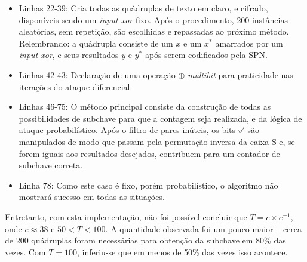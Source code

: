 \documentclass{article}
\begin{document}


\begin{itemize}

    \item Linhas 22-39: Cria todas as quádruplas de texto em claro, e cifrado,
        disponíveis sendo um \textit{input-xor} fixo. Após o procedimento, 200
        instâncias aleatórias, sem repetição, são escolhidas e repassadas ao
        próximo método. Relembrando: a quádrupla consiste de um $x$ e um $x^*$
        amarrados por um \textit{input-xor}, e seus resultados $y$ e $y^*$ após
        serem codificados pela SPN.

    \item Linhas 42-43: Declaração de uma operação $\oplus$ \textit{multibit}
        para praticidade nas iterações do ataque diferencial.

    \item Linhas 46-75: O método principal consiste da construção de todas as
        possibilidades de subchave para que a contagem seja realizada, e da
        lógica de ataque probabilístico. Após o filtro de pares inúteis, os
        bits $v'$ são manipulados de modo que passam pela permutação inversa
        da caixa-S e, se forem iguais aos resultados desejados, contribuem
        para um contador de subchave correta.

    \item Linha 78: Como este caso é fixo, porém probabilístico, o algoritmo
        não mostrará sucesso em todas as situações.

\end{itemize}

Entretanto, com esta implementação, não foi possível concluir que
$T = c \times e^{-1}$, onde $e \approx 38$ e $50 < T < 100$. A quantidade
observada foi um pouco maior -- cerca de 200 quádruplas foram necessárias para
obtenção da subchave em 80\% das vezes. Com $T = 100$, inferiu-se que em menos
de 50\% das vezes isso acontece.



\end{document}
